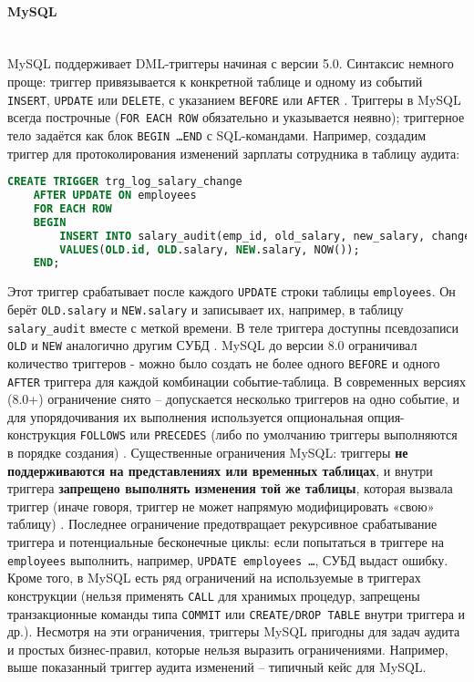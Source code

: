\paragraph{\textbf{MySQL}} ~\\
 MySQL поддерживает DML-триггеры начиная с версии 5.0. Синтаксис немного проще: триггер привязывается к конкретной таблице и одному из событий \texttt{INSERT}, \texttt{UPDATE} или \texttt{DELETE}, с указанием \texttt{BEFORE} или \texttt{AFTER} \autocite{Mysqldoc5}. Триггеры в MySQL всегда построчные (\texttt{FOR EACH ROW} обязательно и указывается неявно); триггерное тело задаётся как блок \texttt{BEGIN \ldots END} с SQL-командами. Например, создадим триггер для протоколирования изменений зарплаты сотрудника в таблицу аудита:

 \begin{lstlisting}[language=SQL]
    CREATE TRIGGER trg_log_salary_change
    AFTER UPDATE ON employees
    FOR EACH ROW
    BEGIN
        INSERT INTO salary_audit(emp_id, old_salary, new_salary, changed_at)
        VALUES(OLD.id, OLD.salary, NEW.salary, NOW());
    END;
 \end{lstlisting}

 Этот триггер срабатывает после каждого \texttt{UPDATE} строки таблицы \texttt{employees}. Он берёт \texttt{OLD.salary} и \texttt{NEW.salary} и записывает их, например, в таблицу \texttt{salary\_audit} вместе с меткой времени. В теле триггера доступны псевдозаписи \texttt{OLD} и \texttt{NEW} аналогично другим СУБД \autocite{Mysqldoc5}. 
 MySQL до версии 8.0 ограничивал количество триггеров - можно было создать не более одного \texttt{BEFORE} и одного \texttt{AFTER} триггера для каждой комбинации событие-таблица. В современных версиях (8.0+) ограничение снято – допускается несколько триггеров на одно событие, и для упорядочивания их выполнения используется опциональная опция-конструкция \texttt{FOLLOWS} или \texttt{PRECEDES} (либо по умолчанию триггеры выполняются в порядке создания) \autocite{Mysqldoc5}.
 Существенные ограничения MySQL: триггеры \textbf{не поддерживаются на представлениях или временных таблицах}, и внутри триггера \textbf{запрещено выполнять изменения той же таблицы}, которая вызвала триггер (иначе говоря, триггер не может напрямую модифицировать «свою» таблицу) \autocite{Mysqldoc6}. Последнее ограничение предотвращает рекурсивное срабатывание триггера и потенциальные бесконечные циклы: если попытаться в триггере на \texttt{employees} выполнить, например, \texttt{UPDATE employees \ldots}, СУБД выдаст ошибку. Кроме того, в MySQL есть ряд ограничений на используемые в триггерах конструкции (нельзя применять \texttt{CALL} для хранимых процедур, запрещены транзакционные команды типа \texttt{COMMIT} или \texttt{CREATE/DROP TABLE} внутри триггера и др.). Несмотря на эти ограничения, триггеры MySQL пригодны для задач аудита и простых бизнес-правил, которые нельзя выразить ограничениями. Например, выше показанный триггер аудита изменений – типичный кейс для MySQL.

